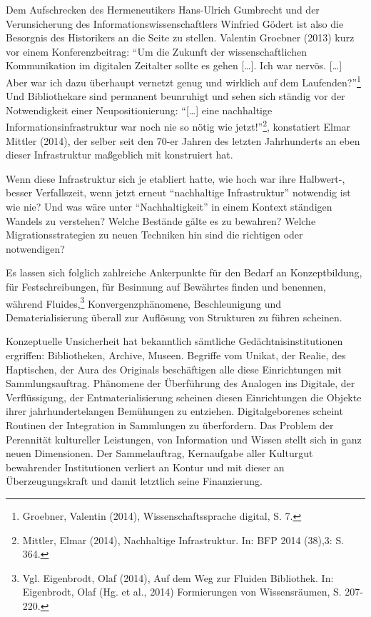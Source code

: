 \documentclass[a4paper,
fontsize=11pt,
oneside,
numbers=noperiodatend,
parskip=half-,
bibliography=totoc,
final
]{scrartcl}
\begin{document}
Dem Aufschrecken des Hermeneutikers Hans-Ulrich Gumbrecht und der
Verunsicherung des Informationswissenschaftlers Winfried Gödert ist also
die Besorgnis des Historikers an die Seite zu stellen. Valentin Groebner
(2013) kurz vor einem Konferenzbeitrag: \enquote{Um die Zukunft der
wissenschaftlichen Kommunikation im digitalen Zeitalter sollte es gehen
{[}\ldots{}{]}. Ich war nervös. {[}\ldots{}{]} Aber war ich dazu
überhaupt vernetzt genug und wirklich auf dem Laufenden?}\footnote{Groebner,
  Valentin (2014), Wissenschaftssprache digital, S. 7.} Und
Bibliothekare sind permanent beunruhigt und sehen sich ständig vor der
Notwendigkeit einer Neupositionierung: \enquote{{[}\ldots{}{]} eine
nachhaltige Informationsinfrastruktur war noch nie so nötig wie
jetzt!}\footnote{Mittler, Elmar (2014), Nachhaltige Infrastruktur. In:
  BFP 2014 (38),3: S. 364.}, konstatiert Elmar Mittler (2014), der
selber seit den 70-er Jahren des letzten Jahrhunderts an eben dieser
Infrastruktur maßgeblich mit konstruiert hat.

Wenn diese Infrastruktur sich je etabliert hatte, wie hoch war ihre
Halbwert-, besser Verfallszeit, wenn jetzt erneut \enquote{nachhaltige
Infrastruktur} notwendig ist wie nie? Und was wäre unter
\enquote{Nachhaltigkeit} in einem Kontext ständigen Wandels zu
verstehen? Welche Bestände gälte es zu bewahren? Welche
Migrationsstrategien zu neuen Techniken hin sind die richtigen oder
notwendigen?

Es lassen sich folglich zahlreiche Ankerpunkte für den Bedarf an
Konzeptbildung, für Festschreibungen, für Besinnung auf Bewährtes finden
und benennen, während Fluides,\footnote{Vgl. Eigenbrodt, Olaf (2014),
  Auf dem Weg zur Fluiden Bibliothek. In: Eigenbrodt, Olaf (Hg. et al.,
  2014) Formierungen von Wissensräumen, S. 207-220.}
Konvergenzphänomene, Beschleunigung und Dematerialisierung überall zur
Auflösung von Strukturen zu führen scheinen.

Konzeptuelle Unsicherheit hat bekanntlich sämtliche
Gedächtnisinstitutionen ergriffen: Bibliotheken, Archive, Museen.
Begriffe vom Unikat, der Realie, des Haptischen, der Aura des Originals
beschäftigen alle diese Einrichtungen mit Sammlungsauftrag. Phänomene
der Überführung des Analogen ins Digitale, der Verflüssigung, der
Entmaterialisierung scheinen diesen Einrichtungen die Objekte ihrer
jahrhundertelangen Bemühungen zu entziehen. Digitalgeborenes scheint
Routinen der Integration in Sammlungen zu überfordern. Das Problem der
Perennität kultureller Leistungen, von Information und Wissen stellt
sich in ganz neuen Dimensionen. Der Sammelauftrag, Kernaufgabe aller
Kulturgut bewahrender Institutionen verliert an Kontur und mit dieser an
Überzeugungskraft und damit letztlich seine Finanzierung.
\end{document}
